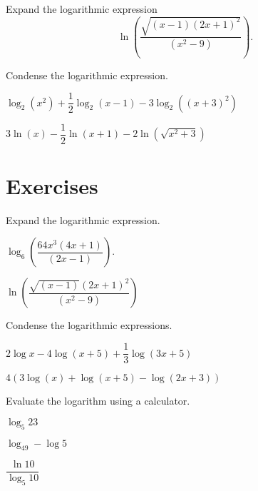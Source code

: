 \vspace*{-0.2\textheight}

\begin{example}
  Expand the logarithmic expression
  \[\ln \left (\dfrac{\sqrt{(x-1){(2x+1)}^2}}{(x^2-9)}\right ).\]
\end{example}

\begin{example}
  Condense the logarithmic expression.\\
  \begin{enumerate*}
    \item $\log_2(x^2)+\dfrac{1}{2}\log_2(x-1)-3\log_2({(x+3)}^2)$
    \item $3\ln(x)-\dfrac{1}{2}\ln(x+1)-2\ln(\sqrt{x^2+3})$ \hfill\null
  \end{enumerate*}
\end{example}

\newpage

\section*{Exercises}

\begin{exercise}
    Expand the logarithmic expression.\\
    \begin{enumerate*}
     \item $\log_6\left(\dfrac{64x^3(4x+1)}{(2x-1)} \right)$.
     \item $\ln\left(\dfrac{\sqrt{(x-1)}(2x+1)^2}{(x^2-9)}\right)$
     \hfill\null
    \end{enumerate*}
\end{exercise}

\begin{exercise}
  Condense the logarithmic expressions.\\
  \begin{enumerate*}
    \item $2\log x-4\log(x+5)+\dfrac{1}{3}\log(3x+5)$
    \item $4(3\log(x)+\log(x+5)-\log(2x+3))$
  \end{enumerate*}
\end{exercise}

\begin{exercise}
  Evaluate the logarithm using a calculator.\\
  \begin{enumerate*}
    \item $\log_5{23}$
    \item $\log_49-\log5$
    \item $\dfrac{\ln10}{\log_5{10}}$\hfill\null
  \end{enumerate*}
\end{exercise}

